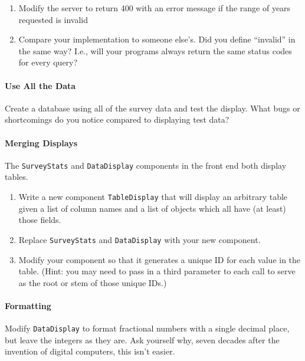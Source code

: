 \begin{enumerate}
\tightlist
\item
  Modify the server to return 400 with an error message if the range of
  years requested is invalid
\item
  Compare your implementation to someone else's. Did you define
  ``invalid'' in the same way? I.e., will your programs always return
  the same status codes for every query?
\end{enumerate}

\paragraph{Use All the Data}\label{use-all-the-data}

Create a database using all of the survey data and test the display.
What bugs or shortcomings do you notice compared to displaying test
data?

\paragraph{Merging Displays}\label{merging-displays}

The \texttt{SurveyStats} and \texttt{DataDisplay} components in the
front end both display tables.

\begin{enumerate}
\tightlist
\item
  Write a new component \texttt{TableDisplay} that will display an
  arbitrary table given a list of column names and a list of objects
  which all have (at least) those fields.
\item
  Replace \texttt{SurveyStats} and \texttt{DataDisplay} with your new
  component.
\item
  Modify your component so that it generates a unique ID for each value
  in the table. (Hint: you may need to pass in a third parameter to each
  call to serve as the root or stem of those unique IDs.)
\end{enumerate}

\paragraph{Formatting}\label{formatting}

Modify \texttt{DataDisplay} to format fractional numbers with a single
decimal place, but leave the integers as they are. Ask yourself why,
seven decades after the invention of digital computers, this isn't
easier.

